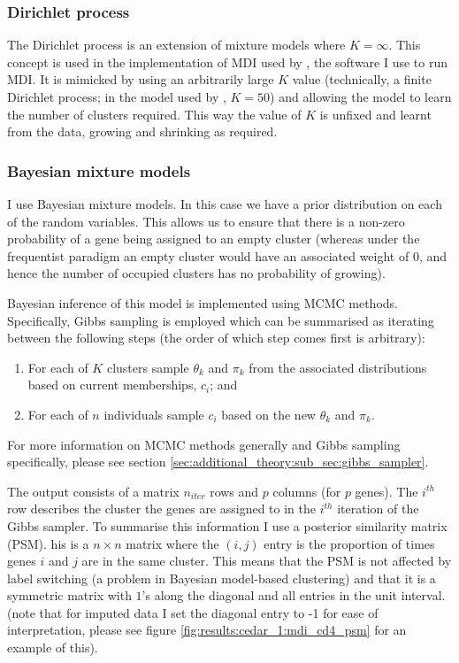 \documentclass[12pt]{article} %
\begin{document}
	\subsubsection{Dirichlet process}
	The Dirichlet process is an extension of mixture models where $K = \infty$. This concept is used in the implementation of MDI used by \citet{MasonMDIGPUacceleratingintegrative2016a}, the software I use to run MDI. It is mimicked by using an arbitrarily large $K$ value (technically, a finite Dirichlet process; in the model used by \citet{MasonMDIGPUacceleratingintegrative2016a}, $K=50$) and allowing the model to learn the number of clusters required. This way the value of $K$ is unfixed and learnt from the data, growing and shrinking as required.
	
	\subsubsection{Bayesian mixture models}
	I use Bayesian mixture models. In this case we have a prior distribution on each of the random variables. This allows us to ensure that there is a non-zero probability of a gene being assigned to an empty cluster (whereas under the frequentist paradigm an empty cluster would have an associated weight of 0, and hence the number of occupied clusters has no probability of growing). 
	
	Bayesian inference of this model is implemented using MCMC methods. Specifically, Gibbs sampling is employed which can be summarised as iterating between the following steps (the order of which step comes first is arbitrary):
	\begin{enumerate}
		\item For each of $K$ clusters sample $\theta_k$ and $\pi_k$ from the associated distributions based on current memberships, $c_i$; and
		\item For each of $n$ individuals sample $c_i$ based on the new $\theta_k$ and $\pi_k$.
	\end{enumerate}
	For more information on MCMC methods generally and Gibbs sampling specifically, please see section \ref{sec:additional_theory:sub_sec:gibbs_sampler}.
	
	
	The output consists of a matrix $n_{iter}$ rows and $p$ columns (for $p$ genes). The $i^{th}$ row describes the cluster the genes are assigned to in the $i^{th}$ iteration of the Gibbs sampler. To summarise this information I use a posterior similarity matrix (PSM). his is a $n \times n$ matrix where the $(i,j)$ entry is the proportion of times genes $i$ and $j$ are in the same cluster. This means that the PSM is not affected by label switching (a problem in Bayesian model-based clustering) and that it is a symmetric matrix with $1$'s along the diagonal and all entries in the unit interval. (note that for imputed data I set the diagonal entry to -1 for ease of interpretation, please see figure \ref{fig:results:cedar_1:mdi_cd4_psm} for an example of this).
	
\end{document}
